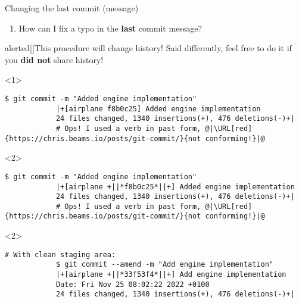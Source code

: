 \documentclass[usenames,svgnames,14pt]{beamer}
\begin{document}
\begin{frame}[fragile]{Changing the last commit (message)}
    \begin{enumerate}
        \item How can I fix a typo in the \textbf{last} commit message?
    \end{enumerate}
    \begin{varblock}{alerted}[\textwidth]{This procedure will change history!}
        Said differently, feel free to do it if you \alert{\textbf{did not}} share history!
    \end{varblock}
    \vspace{3mm}
    \begin{onlyenv}<1>
        \begin{lstlisting}[style=MyBash]
            $ git commit -m "Added engine implementation"
            |+[airplane f8b0c25] Added engine implementation
            24 files changed, 1340 insertions(+), 476 deletions(-)+|
            # Ops! I used a verb in past form, @|\URL[red]{https://chris.beams.io/posts/git-commit/}{not conforming!}|@
        \end{lstlisting}
    \end{onlyenv}
    \begin{onlyenv}<2>
        \begin{lstlisting}[style=MyBash]
            $ git commit -m "Added engine implementation"
            |+[airplane +||*f8b0c25*||+] Added engine implementation
            24 files changed, 1340 insertions(+), 476 deletions(-)+|
            # Ops! I used a verb in past form, @|\URL[red]{https://chris.beams.io/posts/git-commit/}{not conforming!}|@
        \end{lstlisting}
    \end{onlyenv}
    \begin{uncoverenv}<2>
        \begin{lstlisting}[style=MyBash]
            # With clean staging area:
            $ git commit --amend -m "Add engine implementation"
            |+[airplane +||*33f53f4*||+] Add engine implementation
            Date: Fri Nov 25 08:02:22 2022 +0100
            24 files changed, 1340 insertions(+), 476 deletions(-)+|
        \end{lstlisting}
    \end{uncoverenv}
\end{frame}
\end{document}
